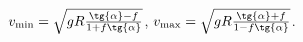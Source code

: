$v_{\min} = \sqrt{gR\frac{\tg{\alpha} - f}{1 + f\tg{\alpha}}}$,
$v_{\max} = \sqrt{gR\frac{\tg{\alpha} + f}{1 - f\tg{\alpha}}}$.
